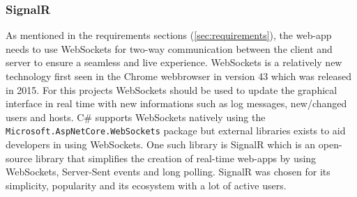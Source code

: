\documentclass{article}
\begin{document}
\subsubsection{SignalR}
As mentioned in the requirements sections (\ref{sec:requirements}), the web-app needs to use WebSockets for two-way communication between the client and server to ensure a seamless and live experience. WebSockets is a relatively new technology first seen in the Chrome webbrowser in version 43 which was released in 2015\cite{url:implementation:websockets}. For this projects WebSockets should be used to update the graphical interface in real time with new informations such as log messages, new/changed users and hosts. C\# supports WebSockets natively using the \texttt{Microsoft.AspNetCore.WebSockets} package but external libraries exists to aid developers in using WebSockets. One such library is SignalR\cite{url:implementation:signalr} which is an open-source library that simplifies the creation of real-time web-apps by using WebSockets, Server-Sent events and long polling. SignalR was chosen for its simplicity, popularity and its ecosystem with a lot of active users.
\end{document}
